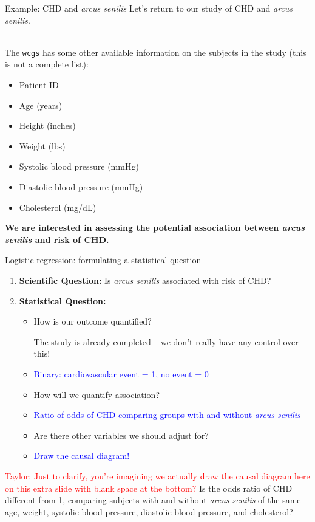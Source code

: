 \documentclass[10pt,t]{beamer}
\begin{document}
\begin{frame}{Example: CHD and \textit{arcus senilis}}
	Let's return to our study of CHD and \textit{arcus senilis}.
	\\ ~\
	
	The \texttt{wcgs} has some other available information on the subjects in the study (this is not a complete list):
	\begin{itemize}
		\item Patient ID
		\item Age (years)
		\item Height (inches)
		\item Weight (lbs)
		\item Systolic blood pressure (mmHg)
		\item Diastolic blood pressure (mmHg)
		\item Cholesterol (mg/dL)
	\end{itemize}  

	\textbf{We are interested in assessing the potential association between \textit{arcus senilis} and risk of CHD.} 
\end{frame}

\begin{frame}{Logistic regression: formulating a statistical question}
	\begin{enumerate}
		\item \textbf{Scientific Question:} \pause Is \textit{arcus senilis} associated with risk of CHD? \pause
		\item \textbf{Statistical Question:} \pause 
		\begin{itemize}
			\item How is our outcome quantified? \begin{tiny}The study is already completed -- we don't really have any control over this!\end{tiny}\pause
			\item[] \textcolor{blue}{Binary: cardiovascular event = 1, no event = 0}\pause
			\item How will we quantify association? \pause
			\item[] \textcolor{blue}{Ratio of odds of CHD comparing groups with and without \textit{arcus senilis}}\pause
			\item Are there other variables we should adjust for?\pause
			\item[] \textcolor{blue}{Draw the causal diagram!}\pause
		\end{itemize}
	\end{enumerate}\pause \textcolor{red}{Taylor: Just to clarify, you're imagining we actually draw the causal diagram here on this extra slide with blank space at the bottom?}
\vspace{1cm}
Is the odds ratio of CHD different from 1, comparing subjects with and without \textit{arcus senilis} of the same age, weight, systolic blood pressure, diastolic blood pressure, and cholesterol? 
\end{frame}
\end{document}
